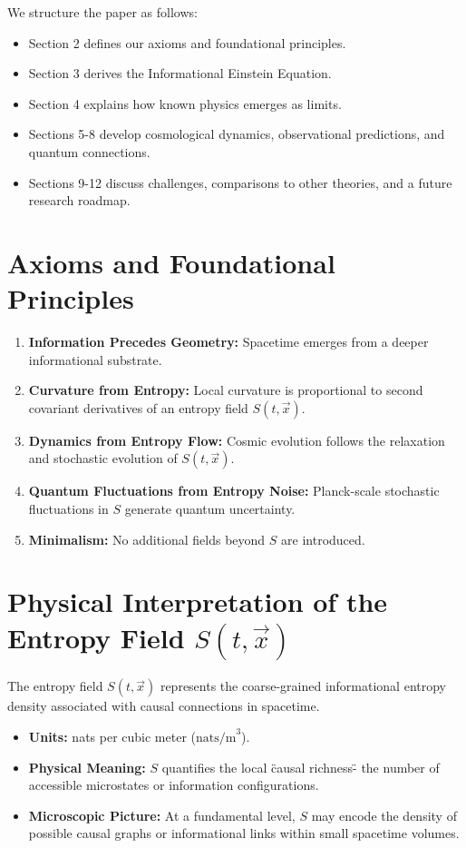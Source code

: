 \documentclass{article}
\begin{document}
We structure the paper as follows:
\begin{itemize}
    \item Section 2 defines our axioms and foundational principles.
    \item Section 3 derives the Informational Einstein Equation.
    \item Section 4 explains how known physics emerges as limits.
    \item Sections 5-8 develop cosmological dynamics, observational predictions, and quantum connections.
    \item Sections 9-12 discuss challenges, comparisons to other theories, and a future research roadmap.
\end{itemize}

\section{Axioms and Foundational Principles}

\begin{enumerate}
    \item \textbf{Information Precedes Geometry:} Spacetime emerges from a deeper informational substrate.
    \item \textbf{Curvature from Entropy:} Local curvature is proportional to second covariant derivatives of an entropy field $S(t, \vec{x})$.
    \item \textbf{Dynamics from Entropy Flow:} Cosmic evolution follows the relaxation and stochastic evolution of $S(t, \vec{x})$.
    \item \textbf{Quantum Fluctuations from Entropy Noise:} Planck-scale stochastic fluctuations in $S$ generate quantum uncertainty.
    \item \textbf{Minimalism:} No additional fields beyond $S$ are introduced.
\end{enumerate}

\section{Physical Interpretation of the Entropy Field $S(t, \vec{x})$}

The entropy field $S(t, \vec{x})$ represents the coarse-grained informational entropy density associated with causal connections in spacetime.

\begin{itemize}
    \item \textbf{Units:} nats per cubic meter ($\text{nats/m}^3$).
    \item \textbf{Physical Meaning:} $S$ quantifies the local \"causal richness\" - the number of accessible microstates or information configurations.
    \item \textbf{Microscopic Picture:} At a fundamental level, $S$ may encode the density of possible causal graphs or informational links within small spacetime volumes.
\end{itemize}
\end{document}

